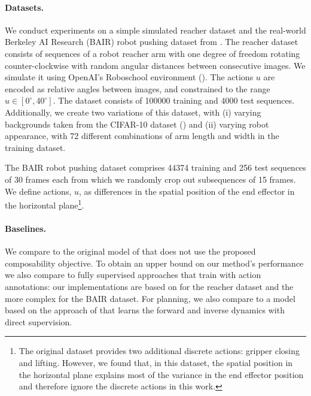 \documentclass{article} %
\begin{document}
\vspace{-8pt}
\paragraph{Datasets.} We conduct experiments on a simple simulated reacher dataset and the real-world Berkeley AI Research (BAIR) robot pushing dataset from \cite{ebert2017self}. The reacher dataset consists of sequences of a robot reacher arm with one degree of freedom rotating counter-clockwise with random angular distances between consecutive images. We simulate it using OpenAI's Roboschool environment (\cite{roboschool}). The actions $u$ are encoded as relative angles between images, and constrained to the range $u \in [0^{\circ}, 40^{\circ}]$. The dataset consists of \SI{100000}{} training and \SI{4000}{} test sequences. Additionally, we create two variations of this dataset, with (i) varying backgrounds taken from the CIFAR-10 dataset (\cite{krizhevsky2009LearningML}) and (ii) varying robot appearance, with 72 different combinations of arm length and width in the training dataset. 

The BAIR robot pushing dataset comprises  \SI{44374}{} training and \SI{256}{} test sequences of \SI{30}{} frames each from which we randomly crop out subsequences of \SI{15}{} frames. We define actions, $u$, as differences in the spatial position of the end effector in the horizontal plane\footnote{The original dataset provides two additional discrete actions: gripper closing and lifting. However, we found that, in this dataset, the spatial position in the horizontal plane explains most of the variance in the end effector position and therefore ignore the discrete actions in this work.}. 
\vspace{-8pt}
\paragraph{Baselines.} We compare to the original model of \cite{denton18stochastic} that does not use the proposed composability objective. To obtain an upper bound on our method's performance we also compare to fully supervised approaches that 
train with action annotations: 
our implementations are based on \cite{Oh:2015:AVP:2969442.2969560} for the reacher dataset and the more complex \cite{finn2017deep} for the BAIR dataset. For planning, we also compare to a model based on the approach of \cite{agrawal2016learning} that learns the forward and inverse dynamics with direct supervision.
\vspace{-8pt}
\end{document}
